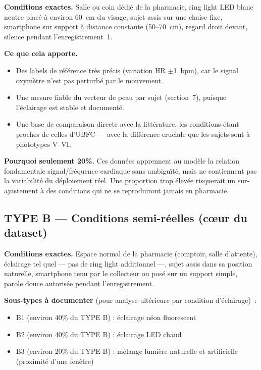 \documentclass[11pt,a4paper]{article}
\begin{document}
\textbf{Conditions exactes.} Salle ou coin d\'edi\'e de la pharmacie, ring
light LED blanc neutre plac\'e \`a environ 60~cm du visage, sujet assis sur
une chaise fixe, smartphone sur support \`a distance constante (50--70~cm),
regard droit devant, silence pendant l'enregistrement~1.

\textbf{Ce que cela apporte.}
\begin{itemize}
\item Des labels de r\'ef\'erence tr\`es pr\'ecis (variation HR
$\pm$1~bpm), car le signal oxym\`etre n'est pas perturb\'e par le mouvement.
\item Une mesure fiable du vecteur de peau par sujet (section~7), puisque
l'\'eclairage est stable et document\'e.
\item Une base de comparaison directe avec la litt\'erature, les conditions
\'etant proches de celles d'UBFC --- avec la diff\'erence cruciale que les
sujets sont \`a phototypes V--VI.
\end{itemize}

\textbf{Pourquoi seulement 20\%.} Ces donn\'ees apprennent au mod\`ele la
relation fondamentale signal/fr\'equence cardiaque sans ambigu\"it\'e, mais
ne contiennent pas la variabilit\'e du d\'eploiement r\'eel. Une proportion
trop \'elev\'ee risquerait un sur-ajustement \`a des conditions qui ne se
reproduiront jamais en pharmacie.

\subsection{TYPE B --- Conditions semi-r\'eelles (cœur du dataset)}

\textbf{Conditions exactes.} Espace normal de la pharmacie (comptoir, salle
d'attente), \'eclairage tel quel --- pas de ring light additionnel ---,
sujet assis dans sa position naturelle, smartphone tenu par le collecteur ou
pos\'e sur un support simple, parole douce autoris\'ee pendant
l'enregistrement.

\textbf{Sous-types \`a documenter} (pour analyse ult\'erieure par condition
d'\'eclairage)~:
\begin{itemize}
\item B1 (environ 40\% du TYPE B) : \'eclairage n\'eon fluorescent
\item B2 (environ 40\% du TYPE B) : \'eclairage LED chaud
\item B3 (environ 20\% du TYPE B) : m\'elange lumi\`ere naturelle et
artificielle (proximit\'e d'une fen\^etre)
\end{itemize}
\end{document}
